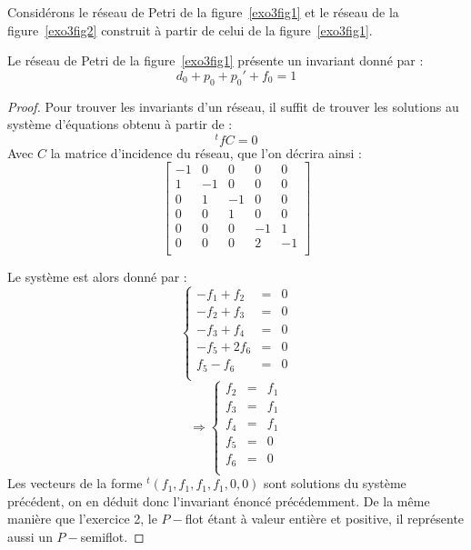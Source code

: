 Considérons le réseau de Petri de la figure~\ref{exo3fig1} et le réseau de la figure~\ref{exo3fig2}
construit à partir de celui de la figure~\ref{exo3fig1}.

\begin{thrm}
    Le réseau de Petri de la figure~\ref{exo3fig1} présente un invariant donné par :
    \[
        d_0 + p_0 + p_0' + f_0 = 1 
    \]
\end{thrm}

\begin{proof}
    Pour trouver les invariants d'un réseau, il suffit de trouver les solutions au système
    d'équations obtenu à partir de : \[
        ^tfC = 0
    \]
    Avec $C$ la matrice d'incidence du réseau, que l'on décrira ainsi :
    \[
        \left [ \begin{array}{ccccc}
            -1 & 0 & 0 & 0 & 0 \\
            1 & -1 & 0 & 0 & 0 \\
            0 & 1 & -1 & 0 & 0 \\
            0 & 0 & 1 & 0 & 0 \\
            0 & 0 & 0 & -1 & 1 \\
            0 & 0 & 0 & 2 & -1 \\
        \end{array}
        \right ]
    \]

    Le système est alors donné par : \[
        \left \lbrace \begin{array}{rcl}
            -f_1 + f_2 & = & 0 \\
            -f_2 + f_3 & = & 0 \\
            -f_3 + f_4 & = & 0 \\
            -f_5 + 2f_6 & = & 0 \\
            f_5 - f_6 & = & 0 \\
        \end{array}
        \right .
    \]
    \[
        \Rightarrow \left \lbrace \begin{array}{rcl}
            f_2 & = & f_1 \\
            f_3 & = & f_1 \\
            f_4 & = & f_1 \\
            f_5 & = & 0 \\
            f_6 & = & 0 \\
        \end{array}
        \right .
    \]
    Les vecteurs de la forme $^t(f_1, f_1, f_1, f_1, 0, 0)$ sont solutions du système précédent, on
    en déduit donc l'invariant énoncé précédemment. De la même manière que l'exercice 2, le $P-$flot
    étant à valeur entière et positive, il représente aussi un $P-$semiflot.
\end{proof}

